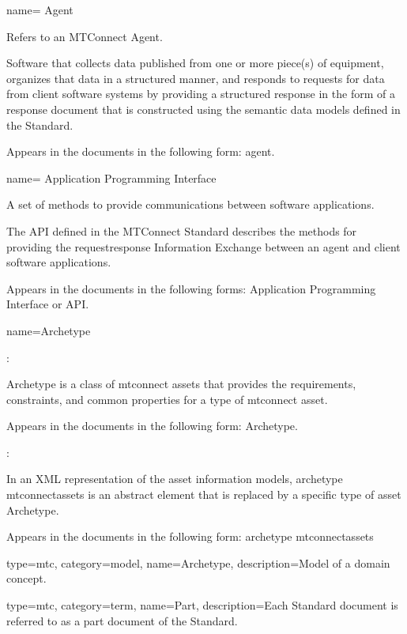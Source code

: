 {
  name= {Agent}
}
{
  Refers to an MTConnect Agent. 
  
  Software that collects data published from one or more piece(s) of equipment, organizes that data in a structured manner, and responds to requests for data from client software systems by providing a structured response in the form of a \gls{response document} that is constructed using the \glspl{semantic data model} defined in the Standard. 
  
  Appears in the documents in the following form: \gls{agent}.
}


{
  name= {Application Programming Interface}
}
{
  A set of methods to provide communications between software applications.

  The API defined in the MTConnect Standard describes the methods for providing the \gls{requestresponse} Information Exchange between an \gls{agent} and client software applications.
  
  Appears in the documents in the following forms: Application Programming Interface or API.
}


{
  name={Archetype}
}
{
  :
  
  Archetype is a class of \glspl{mtconnect asset} that provides the requirements, constraints, and common properties for a type of \gls{mtconnect asset}.

  Appears in the documents in the following form: Archetype.

  :
  
  In an XML representation of the \glspl{asset information model}, \gls{archetype mtconnectassets} is an abstract element that is replaced by a specific type of \gls{asset} Archetype.
  
  Appears in the documents in the following form: \gls{archetype mtconnectassets}
}


{
  type=mtc,
  category=model,
  name={Archetype},
  description={Model of a domain concept.}
}

{
  type=mtc,
  category=term,
  name={Part},
  description={Each Standard document is referred to as a \gls{part document} of the Standard.}
}


